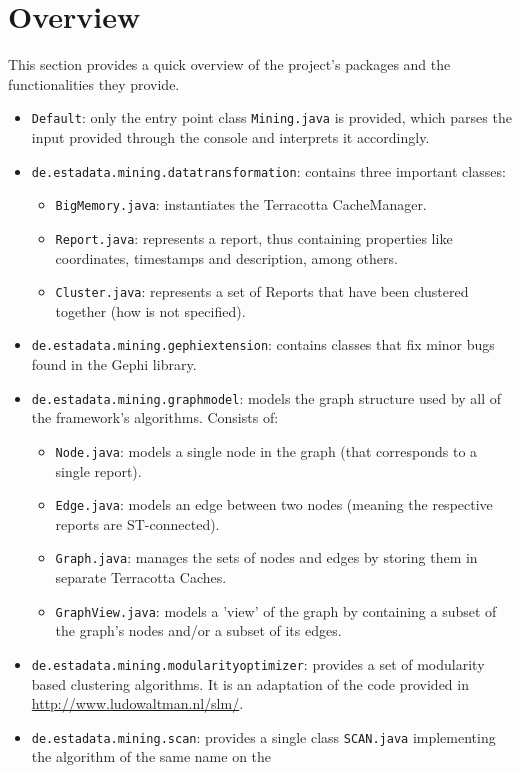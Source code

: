 \documentclass{article}
\begin{document}
	\section{Overview}
		This section provides a quick overview of the project's packages and the functionalities they
		provide.
		\begin{itemize}	
			\item \texttt{Default}: only the entry point class \texttt{Mining.java} is provided, which
				parses the input provided through the console and interprets it accordingly.
			\item \texttt{de.estadata.mining.datatransformation}: contains three important classes:
			\begin{itemize}	
				\item \texttt{BigMemory.java}: instantiates the Terracotta CacheManager.
				\item \texttt{Report.java}: represents a report, thus containing properties like coordinates, timestamps and description, among others.
				\item \texttt{Cluster.java}: represents a set of Reports that have been clustered together (how is not specified).
			\end{itemize}
			\item \texttt{de.estadata.mining.gephiextension}: contains classes that fix minor bugs found in the Gephi library.
			\item \texttt{de.estadata.mining.graphmodel}: models the graph structure used by all of the framework's algorithms. Consists of:
			\begin{itemize}	
				\item \texttt{Node.java}: models a single node in the graph (that corresponds to a single report).
				\item \texttt{Edge.java}: models an edge between two nodes (meaning the respective reports are ST-connected).
				\item \texttt{Graph.java}: manages the sets of nodes and edges by storing them in separate Terracotta Caches.
				\item \texttt{GraphView.java}: models a 'view' of the graph by containing a subset of the graph's nodes and/or a subset of its edges.
			\end{itemize}
			\item \texttt{de.estadata.mining.modularityoptimizer}: provides a set of modularity based clustering algorithms. It is an adaptation of the
				code provided in \url{http://www.ludowaltman.nl/slm/}.
			\item \texttt{de.estadata.mining.scan}: provides a single class \texttt{SCAN.java} implementing the algorithm of the same name on the 

\end{itemize}
\end{document}
